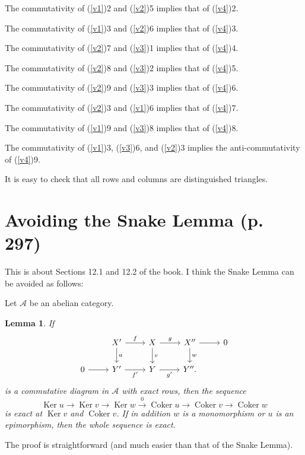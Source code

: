 \documentclass[12pt]{article}
\newtheorem{lem}[thm]{Lemma}
\theoremstyle{remark}
\theoremstyle{definition}
\newcommand{\A}{\mathcal A}
\newcommand{\xr}{\xrightarrow}
\DeclareMathOperator{\Coker}{Coker}
\DeclareMathOperator{\Ker}{Ker}
\begin{document}
The commutativity of (\ref{v1})2 and (\ref{v2})5 implies that of (\ref{v4})2. 

The commutativity of (\ref{v1})3 and (\ref{v2})6 implies that of (\ref{v4})3.

The commutativity of (\ref{v2})7 and (\ref{v3})1 implies that of (\ref{v4})4.

The commutativity of (\ref{v2})8 and (\ref{v3})2 implies that of (\ref{v4})5. 

The commutativity of (\ref{v2})9 and (\ref{v3})3 implies that of (\ref{v4})6. 

The commutativity of (\ref{v2})3 and (\ref{v1})6 implies that of (\ref{v4})7. 

The commutativity of (\ref{v1})9 and (\ref{v3})8 implies that of (\ref{v4})8. 

The commutativity of (\ref{v1})3, (\ref{v3})6, and (\ref{v2})3 implies the anti-commutativity of (\ref{v4})9. 

It is easy to check that all rows and columns are distinguished triangles. 
%
\section{Avoiding the Snake Lemma (p. 297)} %
%
This is about Sections 12.1 and 12.2 of the book. I think the Snake Lemma can be avoided as follows: 

Let $\A$ be an abelian category. 
%
\begin{lem}\label{sl1}
If 
$$
\begin{tikzcd}
{}&X'\ar{d}{u}\ar{r}{f}&X\ar{d}{v}\ar{r}{g}&X''\ar{d}{w}\ar{r}&0\\ 
0\ar{r}&Y'\ar{r}[swap]{f'}&Y\ar{r}[swap]{g'}&Y''.
\end{tikzcd}
$$ 
is a commutative diagram in $\A$ with exact rows, then the sequence 
$$
\Ker u\to\Ker v\to\Ker w\xr0\Coker u\to\Coker v\to\Coker w
$$
is exact at $\Ker v$ and $\Coker v$. If in addition $w$ is a monomorphism or $u$ is an epimorphism, then the whole sequence is exact.
\end{lem}
%
The proof is straightforward (and much easier than that of the Snake Lemma). 
\end{document}
